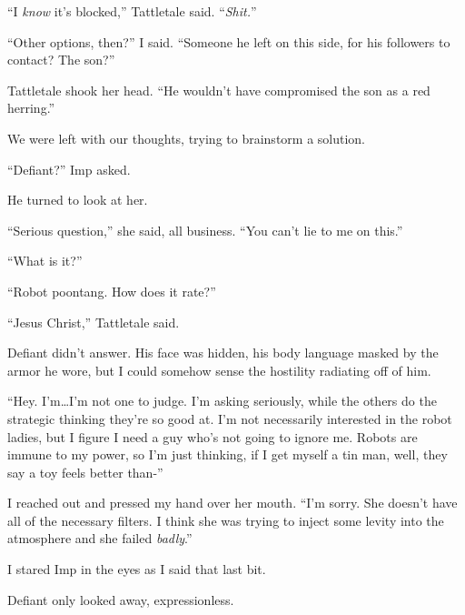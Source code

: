 ``I \emph{know} it's blocked,'' Tattletale said.  ``\emph{Shit.}''



``Other options, then?'' I said.  ``Someone he left on this side, for his followers to contact?  The son?''



Tattletale shook her head.  ``He wouldn't have compromised the son as a red herring.''



We were left with our thoughts, trying to brainstorm a solution.



``Defiant?'' Imp asked.



He turned to look at her.



``Serious question,'' she said, all business.  ``You can't lie to me on this.''



``What is it?''



``Robot poontang.  How does it rate?''



``Jesus Christ,'' Tattletale said.



Defiant didn't answer.  His face was hidden, his body language masked by the armor he wore, but I could somehow sense the hostility radiating off of him.



``Hey.  I'm\ldots I'm not one to judge.  I'm asking seriously, while the others do the strategic thinking they're so good at.  I'm not necessarily interested in the robot ladies, but I figure I need a guy who's not going to ignore me.  Robots are immune to my power, so I'm just thinking, if I get myself a tin man, well, they say a toy feels better than-''



I reached out and pressed my hand over her mouth.  ``I'm sorry.  She doesn't have all of the necessary filters.  I think she was trying to inject some levity into the atmosphere and she failed \emph{badly}.''



I stared Imp in the eyes as I said that last bit.



Defiant only looked away, expressionless.



